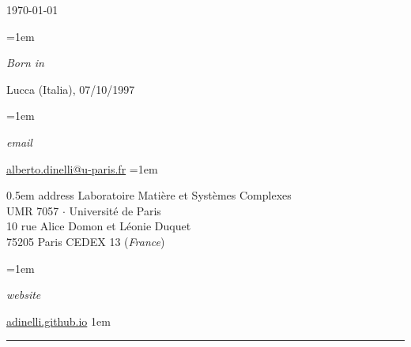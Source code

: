 \documentclass{scrartcl}
\newcommand\deepchestnut[1]{\textcolor{deepchestnut}{#1}}
\newlength{\datebox}\settowidth{\datebox}{Sep 2019 - Feb 2020} %
\newcommand{\NewEntry}[3]{\noindent\hangindent=1em\hangafter=0 \parbox{\datebox}{\small \textit{#1}}\hspace{1.5em} #2 #3
  \vspace{0.5em}
}
\newcommand{\rdate}[1]{\textsc{#1}}
\begin{document}
\hfill \rdate{\today}

\begin{cv}{}
  \small
  
\vspace{2.0em} %


\NewEntry{Born in}{Lucca (Italia),}{07/10/1997} %

\NewEntry{email}{\href{mailto:alberto.dinelli@u-paris.fr}{\deepchestnut{alberto.dinelli@u-paris.fr}}} %

\NewEntry{address}{Laboratoire Matière et Systèmes Complexes \\\-\hspace{4.0cm}UMR 7057 $\cdotp$ Université de Paris\\
  \-\hspace{4.0cm}10 rue Alice Domon et Léonie Duquet\\
  \-\hspace{4.0cm}75205 Paris CEDEX 13 (\textit{France})}

\NewEntry{website}{\href{https://adinelli.github.io/}{\deepchestnut{adinelli.github.io}}}

\vspace{1em}

\par\noindent\rule{\textwidth}{0.4pt}

\vspace{1.5em}












\noindent{}\vspace{1em}
\small

\begin{tabular}{p{4cm}|p{14cm}} %
  

\end{tabular}
\end{cv}
\end{document}
